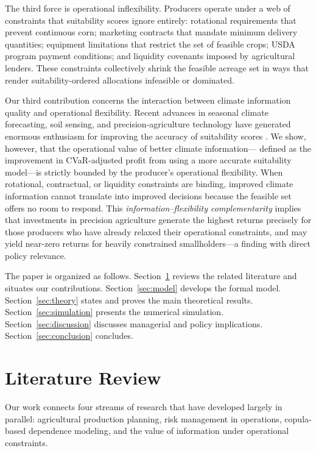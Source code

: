 \documentclass[12pt,review,authoryear]{elsarticle}
\numberwithin{equation}{section}
\begin{document}
The third force is operational inflexibility.  Producers operate under a
web of constraints that suitability scores ignore entirely: rotational
requirements that prevent continuous corn; marketing contracts that
mandate minimum delivery quantities; equipment limitations that restrict
the set of feasible crops; USDA program payment conditions; and liquidity
covenants imposed by agricultural lenders.  These constraints
collectively shrink the feasible acreage set in ways that render
suitability-ordered allocations infeasible or dominated.

Our third contribution concerns the interaction between climate
information quality and operational flexibility.  Recent advances in
seasonal climate forecasting, soil sensing, and precision-agriculture
technology have generated enormous enthusiasm for improving the accuracy
of suitability scores \citep{Lobell2009,Kuwayama2019}.  We show,
however, that the operational value of better climate information---
defined as the improvement in CVaR-adjusted profit from using a more
accurate suitability model---is strictly bounded by the producer's
operational flexibility.  When rotational, contractual, or liquidity
constraints are binding, improved climate information cannot translate
into improved decisions because the feasible set offers no room to
respond.  This \emph{information--flexibility complementarity} implies
that investments in precision agriculture generate the highest returns
precisely for those producers who have already relaxed their operational
constraints, and may yield near-zero returns for heavily constrained
smallholders---a finding with direct policy relevance.

The paper is organized as follows.  Section~\ref{sec:literature} reviews
the related literature and situates our contributions.
Section~\ref{sec:model} develops the formal model.
Section~\ref{sec:theory} states and proves the main theoretical results.
Section~\ref{sec:simulation} presents the numerical simulation.
Section~\ref{sec:discussion} discusses managerial and policy implications.
Section~\ref{sec:conclusion} concludes.

\section{Literature Review}
\label{sec:literature}

Our work connects four streams of research that have developed largely
in parallel: agricultural production planning, risk management in
operations, copula-based dependence modeling, and the value of
information under operational constraints.
\end{document}
